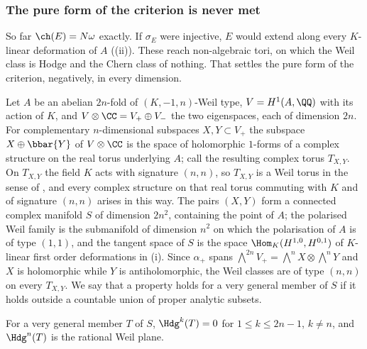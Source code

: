 \subsubsection*{The pure form of the criterion is never met}

So far $\ch(E)=N\omega$ exactly. If $\sigma_{E}$ were injective, $E$ would
extend along every $K$-linear deformation of $A$ ((ii)).
These reach non-algebraic tori, on which the Weil class is Hodge and the Chern
class of nothing. That settles the pure form of the criterion, negatively, in
every dimension.

\begin{setupenv}\label{setup:weiltori}
Let $A$ be an abelian $2n$-fold of $(K,-1,n)$-Weil type, $V=H^{1}(A,\QQ)$ with
its action of $K$, and $V\otimes\CC=V_{+}\oplus V_{-}$ the two eigenspaces,
each of dimension $2n$. For complementary $n$-dimensional subspaces
$X,Y\subset V_{+}$ the subspace $X\oplus\bbar{Y}$ of $V\otimes\CC$ is the
space of holomorphic $1$-forms of a complex structure on the real torus
underlying $A$; call the resulting complex torus $T_{X,Y}$. On $T_{X,Y}$ the
field $K$ acts with signature $(n,n)$, so $T_{X,Y}$ is a Weil torus in the
sense of \cite{Voi02b}, and every complex structure on that real torus
commuting with $K$ and of signature $(n,n)$ arises in this way. The pairs
$(X,Y)$ form a connected complex manifold $S$ of dimension $2n^{2}$,
containing the point of $A$; the polarised Weil family is the submanifold of
dimension $n^{2}$ on which the polarisation of $A$ is of type $(1,1)$, and the
tangent space of $S$ is the space $\Hom_{K}(H^{1,0},H^{0,1})$ of $K$-linear
first order deformations in (i). Since
$\alpha_{+}$ spans $\bigwedge^{2n}V_{+}=\bigwedge^{n}X\otimes\bigwedge^{n}Y$
and $X$ is holomorphic while $Y$ is antiholomorphic, the Weil classes are of
type $(n,n)$ on every $T_{X,Y}$. We say that a property holds for a very
general member of $S$ if it holds outside a countable union of proper
analytic subsets.
\end{setupenv}

\begin{lemma}
\label{lem:weiltorushodge}
For a very general member $T$ of $S$, $\Hdg^{k}(T)=0$ for
$1\le k\le2n-1$, $k\ne n$, and $\Hdg^{n}(T)$ is the rational Weil plane.
\end{lemma}

